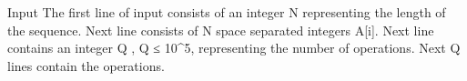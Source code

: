 Input
The first line of input consists of an integer N representing the length of the sequence. Next line consists of N space separated integers A[i]. Next line contains an integer Q , Q ≤ 10^5, representing the number of operations. Next Q lines contain the operations.